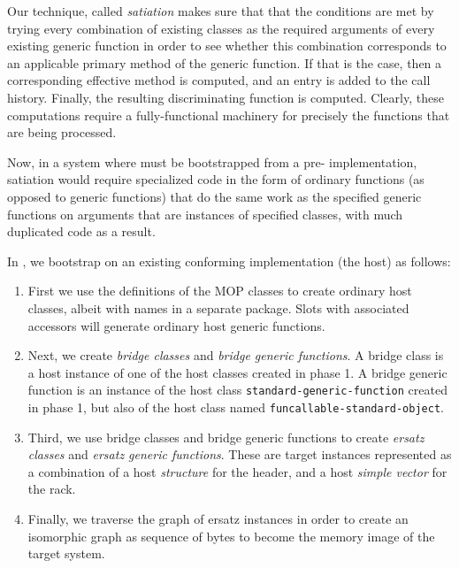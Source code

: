 Our technique, called \emph{satiation} makes sure that that the
conditions are met by trying every combination of existing classes as
the required arguments of every existing generic function in order to
see whether this combination corresponds to an applicable primary
method of the generic function.  If that is the case, then a
corresponding effective method is computed, and an entry is added to
the call history.  Finally, the resulting discriminating function is
computed.  Clearly, these computations require a fully-functional
machinery for precisely the functions that are being processed. 

Now, in a system where \clos{} must be bootstrapped from a pre-\clos{}
implementation, satiation would require specialized code in the form
of ordinary functions (as opposed to generic functions) that do the
same work as the specified generic functions on arguments that are
instances of specified classes, with much duplicated code as a result.

In \sicl{}, we bootstrap \clos{} on an existing conforming \cl{}
implementation (the host) as follows:

\begin{enumerate}
\item First we use the definitions of the MOP classes to create
  ordinary host classes, albeit with names in a separate package.
  Slots with associated accessors will generate ordinary host generic
  functions. 
\item Next, we create \emph{bridge classes} and \emph{bridge generic
  functions}.  A bridge class is a host instance of one of the host
  classes created in phase 1.  A bridge generic function is an
  instance of the host class \texttt{standard-generic-function}
  created in phase 1, but also of the host class named
  \texttt{funcallable-standard-object}.
\item Third, we use bridge classes and bridge generic functions to
  create \emph{ersatz classes} and \emph{ersatz generic functions}.
  These are target instances represented as a combination of a host
  \emph{structure} for the header, and a host \emph{simple vector} for
  the rack. 
\item Finally, we traverse the graph of ersatz instances in order to
  create an isomorphic graph as sequence of bytes to become the memory
  image of the target system.
\end{enumerate}

